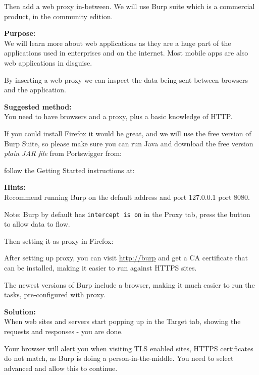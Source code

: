 \documentclass[a4paper,11pt,notitlepage]{report}
\begin{document}
Then add a web proxy in-between. We will use Burp suite which is a commercial product, in the community edition.

{\bf Purpose:}\\
We will learn more about web applications as they are a huge part of the applications used in enterprises and on the internet. Most mobile apps are also web applications in disguise.

By inserting a web proxy we can inspect the data being sent between browsers and the application.

{\bf Suggested method:}\\
You need to have browsers and a proxy, plus a basic knowledge of HTTP.

If you could install Firefox it would be great, and we will use the
free version of Burp Suite, so please make sure you can run Java and
download the free version \emph{plain JAR file} from Portswigger from:


follow the Getting Started instructions at:\\


{\bf Hints:}\\
Recommend running Burp on the default address and port 127.0.0.1 port 8080.

Note: Burp by default has \verb+intercept is on+ in the Proxy tab, press the button to allow data to flow.


Then setting it as proxy in Firefox:


After setting up proxy, you can visit \url{http://burp} and get a CA certificate that can be installed, making it easier to run against HTTPS sites.

The newest versions of Burp include a browser, making it much easier to run the tasks, pre-configured with proxy.

{\bf Solution:}\\
When web sites and servers start popping up in the Target tab, showing the requests and responses - you are done.

Your browser will alert you when visiting TLS enabled sites, HTTPS certificates do not match, as Burp is doing a person-in-the-middle. You need to select advanced and allow this to continue.
\end{document}
